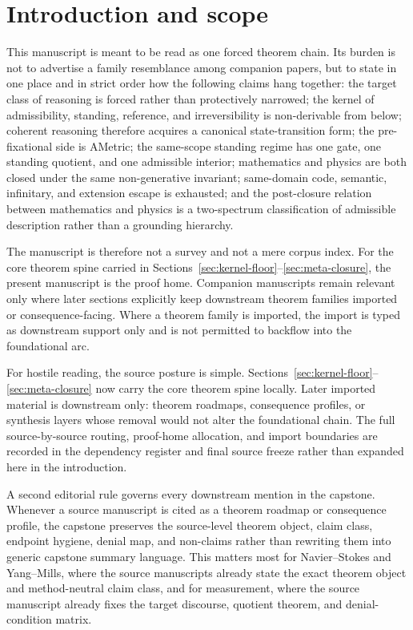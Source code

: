 \section{Introduction and scope}

This manuscript is meant to be read as one forced theorem chain. Its burden is not to advertise a family resemblance among companion papers, but to state in one place and in strict order how the following claims hang together: the target class of reasoning is forced rather than protectively narrowed; the kernel of admissibility, standing, reference, and irreversibility is non-derivable from below; coherent reasoning therefore acquires a canonical state-transition form; the pre-fixational side is AMetric; the same-scope standing regime has one gate, one standing quotient, and one admissible interior; mathematics and physics are both closed under the same non-generative invariant; same-domain code, semantic, infinitary, and extension escape is exhausted; and the post-closure relation between mathematics and physics is a two-spectrum classification of admissible description rather than a grounding hierarchy.

The manuscript is therefore not a survey and not a mere corpus index. For the core theorem spine carried in Sections~\ref{sec:kernel-floor}--\ref{sec:meta-closure}, the present manuscript is the proof home. Companion manuscripts remain relevant only where later sections explicitly keep downstream theorem families imported or consequence-facing. Where a theorem family is imported, the import is typed as downstream support only and is not permitted to backflow into the foundational arc.

For hostile reading, the source posture is simple. Sections~\ref{sec:kernel-floor}--\ref{sec:meta-closure} now carry the core theorem spine locally. Later imported material is downstream only: theorem roadmaps, consequence profiles, or synthesis layers whose removal would not alter the foundational chain. The full source-by-source routing, proof-home allocation, and import boundaries are recorded in the dependency register and final source freeze rather than expanded here in the introduction.


A second editorial rule governs every downstream mention in the capstone. Whenever a source manuscript is cited as a theorem roadmap or consequence profile, the capstone preserves the source-level theorem object, claim class, endpoint hygiene, denial map, and non-claims rather than rewriting them into generic capstone summary language. This matters most for Navier--Stokes and Yang--Mills, where the source manuscripts already state the exact theorem object and method-neutral claim class, and for measurement, where the source manuscript already fixes the target discourse, quotient theorem, and denial-condition matrix.


